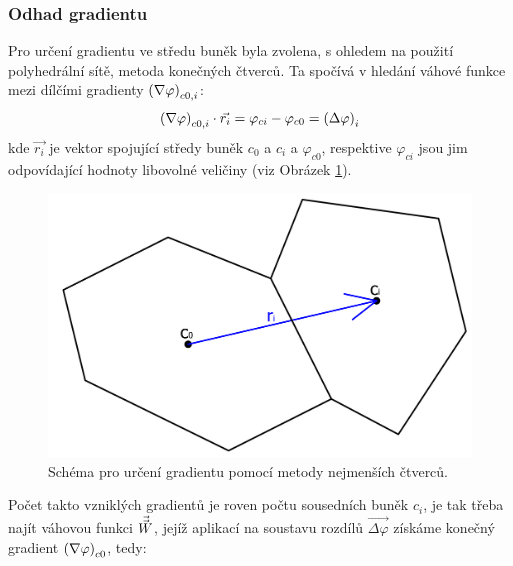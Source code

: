         \subsubsection{Odhad gradientu}
            Pro určení gradientu ve středu buněk byla zvolena, s ohledem na použití polyhedrální sítě, metoda konečných čtverců. Ta spočívá v hledání váhové funkce mezi dílčími gradienty $\left( \nabla \varphi \right)_{c0,i}$:
            \begin{equation}
                \left( \nabla \varphi \right)_{c0,i} \cdot \Vec{r_i} = \varphi _{ci} - \varphi _{c0} = \left( \Delta \varphi \right) _i
            \end{equation}
            \noindent kde $\Vec{r_i}$ je vektor spojující středy buněk $c_0$ a $c_i$ a $\varphi _{c0}$, respektive $\varphi _{ci}$ jsou jim odpovídající hodnoty libovolné veličiny (viz Obrázek \ref{fig:urceni-gradientu}). 
            \begin{figure}[ht!]
                \centering
                \includegraphics[width=.6\textwidth]{300_VYPOCETNI_MODEL/urceni_gradientu.png}
                \caption{Schéma pro určení gradientu pomocí metody nejmenších čtverců.}
                \label{fig:urceni-gradientu}
            \end{figure}
            Počet takto vzniklých gradientů je roven počtu sousedních buněk $c_i$, je tak třeba najít váhovou funkci $\Vec{\Vec{W}}$, jejíž aplikací na soustavu rozdílů $\Vec{\Delta \varphi}$ získáme konečný gradient $\left( \nabla \varphi \right) _{c0}$, tedy:
